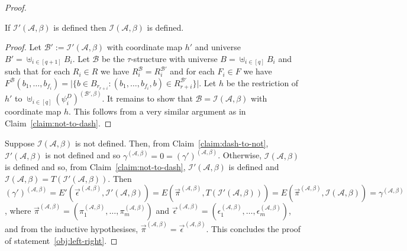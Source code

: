 \documentclass[../main/thesis.tex]{subfiles}
\begin{document}
\begin{proof}
  \begin{claim}
    If $\mathcal{I}'(\mathcal{A}, \beta)$ is defined then
    $\mathcal{I}(\mathcal{A}, \beta)$ is defined.
    \label{claim:dash-to-not}
  \end{claim}
  \begin{proof}
    Let $\mathcal{B}' := \mathcal{I}'(\mathcal{A}, \beta)$ with coordinate map
    $h'$ and universe $B' = \uplus_{i \in [q + 1]} B_i$. Let $\mathcal{B}$ be
    the $\tau$-structure with universe $B = \uplus_{i \in [q]}B_i$ and such that
    for each $R_i \in R$ we have $R^{\mathcal{B}}_i = R^{\mathcal{B}'}_i$ and
    for each $F_i \in F$ we have $F^{\mathcal{B}} (b_1, \ldots, b_{f_i}) = \vert
    \{b \in B_{r_{r + i}} : (b_1, \ldots, b_{f_i}, b) \in R^{\mathcal{B}'}_{r +
      i}\} \vert$. Let $h$ be the restriction of $h'$ to $\uplus_{i \in [q]}
    (\psi^D_i)^{(\mathcal{B}', \beta)}$. It remains to show that $\mathcal{B} =
    \mathcal{I}(\mathcal{A}, \beta)$ with coordinate map $h$. This follows from
    a very similar argument as in Claim~\ref{claim:not-to-dash}.
  \end{proof}



  Suppose $\mathcal{I}(\mathcal{A}, \beta)$ is not defined. Then, from
  Claim~\ref{claim:dash-to-not}, $\mathcal{I}'(\mathcal{A}, \beta)$ is not
  defined and so $\gamma^{(\mathcal{A}, \beta)} = 0 = (\gamma')^{(\mathcal{A},
    \beta)}$. Otherwise, $\mathcal{I}(\mathcal{A}, \beta)$ is defined and so,
  from Claim~\ref{claim:not-to-dash}, $\mathcal{I}'(\mathcal{A}, \beta)$ is
  defined and $\mathcal{I}(\mathcal{A}, \beta) = T(\mathcal{I}'(\mathcal{A},
  \beta))$. Then $(\gamma')^{(\mathcal{A}, \beta)} =
  E'(\vec{\epsilon}^{(\mathcal{A}, \beta)}, \mathcal{I}'(\mathcal{A}, \beta)) =
  E(\vec{\pi}^{(\mathcal{A}, \beta)}, T(\mathcal{I}'(\mathcal{A}, \beta))) =
  E(\vec{\pi}^{(\mathcal{A}, \beta)},\mathcal{I}(\mathcal{A}, \beta)) =
  \gamma^{(\mathcal{A}, \beta)} $, where $\vec{\pi}^{(\mathcal{A}, \beta)} =
  (\pi^{(\mathcal{A}, \beta)}_1, \ldots, \pi^{(\mathcal{A}, \beta)}_m)$ and
  $\vec{\epsilon}^{(\mathcal{A}, \beta)} = (\epsilon^{(\mathcal{A}, \beta)}_1,
  \ldots, \epsilon^{(\mathcal{A}, \beta)}_m)$, and from the inductive
  hypothesises, $\vec{\pi}^{(\mathcal{A}, \beta)} =
  \vec{\epsilon}^{(\mathcal{A}, \beta)}$. This concludes the proof of
  statement~\ref{obj:left-right}.
  

\end{proof}
\end{document}
